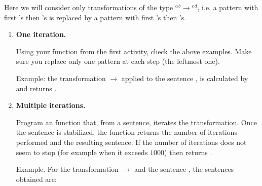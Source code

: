 \documentclass[11pt,class=report,crop=false]{standalone}
\begin{document}

\begin{activite}


Here we will consider only transformations of the type \rzero$^a$\run$^b$$\rightarrow$\run$^c$\rzero$^d$, i.e. a pattern with first \rzero's then \run's is replaced by a pattern with first \run's then \rzero's.



\begin{enumerate}
  \item \textbf{One iteration.}
  
   Using your  function from the first activity, check the above examples. Make sure you replace only one pattern at each step (the leftmost one).
  
  Example: the transformation \rzero\run{} $\rightarrow$ \run\rzero{} applied to the sentence \run\rzero\run, is calculated by  and returns .
   
  \item \textbf{Multiple iterations.}
  
  
  Program an  function that, from a sentence, iterates the transformation. Once the sentence is stabilized, the function returns the number of iterations performed and the resulting sentence. If the number of iterations does not seem to stop (for example when it exceeds $1000$) then returns .
  
  Example. For the transformation \rzero\rzero\run\run{} $\rightarrow$ \run\run\rzero\rzero{} and the sentence \rzero\rzero\rzero\rzero\run\run\rzero\run{}, the sentences obtained are: 
  
{\small
{}
}



\medskip


\end{enumerate}
\end{activite}
\end{document}
